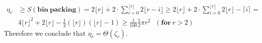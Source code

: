 \begin{enumerate}
\begin{tabular}{ m{5cm} m{9cm}  }
    \end{tabular}
    \begin{equation*}
        \begin{split} \eta_r & \ge S(\mathbf{bin\ packing})= 2\lfloor r \rfloor + 2\cdot\sum_{i=0}^{\lfloor r \rfloor}{2\lfloor r - i \rfloor} \ge 
            2\lfloor r \rfloor + 2\cdot\sum_{i=0}^{\lfloor r \rfloor}{2\lfloor r \rfloor - \lceil i \rceil } = \\ & 4 \lfloor r \rfloor^2 + 2\lfloor r \rfloor  - \frac{1}{2}\left( \lfloor r \rfloor \right)\left(\lfloor r \rfloor - 1\right) \ge \frac{1}{100} \frac{1}{2} \pi r^2 \ \ \ (\mathbf{for\ } r > 2)
        \end{split}
    \end{equation*}
    Therefore we conclude that \(\eta_r = \Theta(\zeta_r) \).

\end{enumerate}





